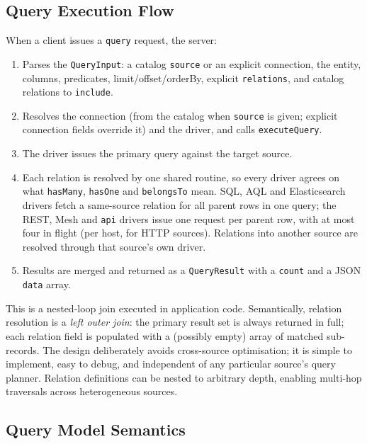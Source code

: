 \documentclass[sigconf,nonacm]{acmart}
\begin{document}
\subsection{Query Execution Flow}

When a client issues a \texttt{query} request, the server:
\begin{enumerate}
  \item Parses the \texttt{QueryInput}: a catalog \texttt{source} or an
        explicit connection, the entity, columns, predicates,
        limit/offset/orderBy, explicit \texttt{relations}, and catalog
        relations to \texttt{include}.
  \item Resolves the connection (from the catalog when \texttt{source}
        is given; explicit connection fields override it) and the
        driver, and calls \texttt{executeQuery}.
  \item The driver issues the primary query against the target source.
  \item Each relation is resolved by one shared routine, so every
        driver agrees on what \texttt{hasMany}, \texttt{hasOne} and
        \texttt{belongsTo} mean.  SQL, AQL and Elasticsearch drivers
        fetch a same-source relation for all parent rows in one query;
        the REST, Mesh and \texttt{api} drivers issue one request per
        parent row, with at most four in flight (per host, for HTTP
        sources).  Relations into another source are resolved through
        that source's own driver.
  \item Results are merged and returned as a \texttt{QueryResult}
        with a \texttt{count} and a JSON \texttt{data} array.
\end{enumerate}

This is a nested-loop join executed in application code.
Semantically, relation resolution is a \emph{left outer join}:
the primary result set is always returned in full; each relation field
is populated with a (possibly empty) array of matched sub-records.
The design deliberately avoids cross-source optimisation; it is simple
to implement, easy to debug, and independent of any particular source's
query planner.  Relation definitions can be nested to arbitrary depth,
enabling multi-hop traversals across heterogeneous sources.

\subsection{Query Model Semantics}
\label{sec:semantics}
\end{document}
